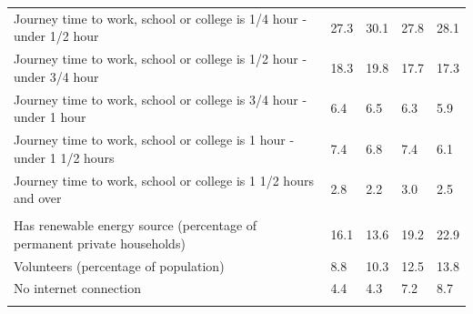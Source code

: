 \documentclass{article}
\begin{document}
\begin{table}[h]
\begin{tabular}{KTTTT}
Journey time to work, school or college is 1/4 hour - under 1/2 hour & 27.3& 30.1& 27.8& 28.1\\
Journey time to work, school or college is 1/2 hour - under 3/4 hour & 18.3& 19.8& 17.7& 17.3\\
Journey time to work, school or college is 3/4 hour - under 1 hour & 6.4& 6.5& 6.3& 5.9\\
Journey time to work, school or college is 1 hour - under 1 1/2 hours & 7.4& 6.8& 7.4& 6.1\\
Journey time to work, school or college is 1 1/2 hours and over & 2.8& 2.2& 3.0& 2.5\\
\hline
    \\ 
    \hline
Has renewable energy source (percentage of permanent private households) & 16.1& 13.6& 19.2& 22.9\\
    \hline
Volunteers (percentage of population) &  8.8& 10.3& 12.5& 13.8\\
    \hline
No internet connection& 4.4& 4.3& 7.2& 8.7\\
\hline
\end{tabular}
\end{table}
\end{document}
